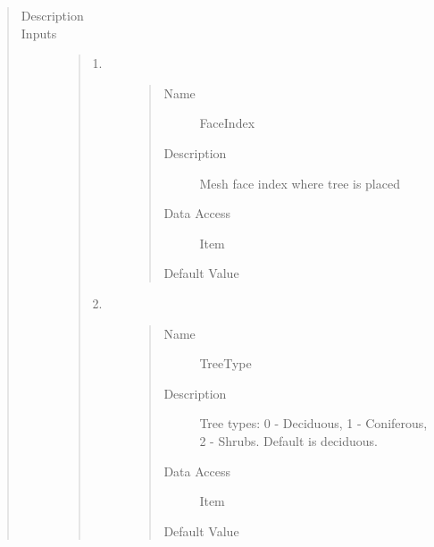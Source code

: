 \documentclass[letterpaper,10pt,english]{sphinxmanual}
\begin{document}
\begin{quote}\begin{description}
\item[{Description}] \leavevmode
{}

\item[{Inputs}] \leavevmode\begin{quote}\begin{description}
\item[{1.}] \leavevmode\begin{quote}\begin{description}
\item[{Name}] \leavevmode
FaceIndex

\item[{Description}] \leavevmode
Mesh face index where tree is placed

\item[{Data Access}] \leavevmode
Item

\item[{Default Value}] \leavevmode
{}

\end{description}\end{quote}

\item[{2.}] \leavevmode\begin{quote}\begin{description}
\item[{Name}] \leavevmode
TreeType

\item[{Description}] \leavevmode
Tree types: 0 - Deciduous, 1 - Coniferous, 2 - Shrubs. Default is deciduous.

\item[{Data Access}] \leavevmode
Item

\item[{Default Value}] \leavevmode
{}

\end{description}\end{quote}


\end{description}
\end{quote}
\end{description}
\end{quote}
\end{document}
